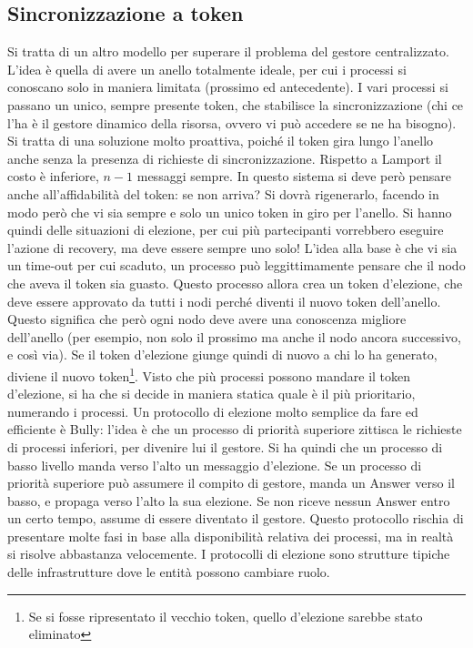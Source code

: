 \subsection{Sincronizzazione a token}
Si tratta di un altro modello per superare il problema del gestore centralizzato. L'idea è quella di avere un anello
totalmente ideale, per cui i processi si conoscano solo in maniera limitata (prossimo ed antecedente). I vari processi
si passano un unico, sempre presente token, che stabilisce la sincronizzazione (chi ce l'ha è il gestore dinamico della
risorsa, ovvero vi può accedere se ne ha bisogno). Si tratta di una soluzione molto proattiva, poiché il token gira
lungo l'anello anche senza la presenza di richieste di sincronizzazione. Rispetto a Lamport il costo è inferiore, 
$n-1$ messaggi sempre.
In questo sistema si deve però pensare anche all'affidabilità del token: se non arriva? Si dovrà rigenerarlo, facendo
in modo però che vi sia sempre e solo un unico token in giro per l'anello. Si hanno quindi delle situazioni di elezione,
per cui più partecipanti vorrebbero eseguire l'azione di recovery, ma deve essere sempre uno solo! L'idea alla base è
che vi sia un time-out per cui scaduto, un processo può leggittimamente pensare che il nodo che aveva il token sia
guasto.
Questo processo allora crea un token d'elezione, che deve essere approvato da tutti i nodi perché diventi il nuovo 
token dell'anello. Questo significa che però ogni nodo deve avere una conoscenza migliore dell'anello (per esempio, non
solo il prossimo ma anche il nodo ancora successivo, e così via). Se il token d'elezione giunge quindi di nuovo a chi
lo ha generato, diviene il nuovo token\footnote{Se si fosse ripresentato il vecchio token, quello d’elezione sarebbe
stato eliminato}. Visto che più processi possono mandare il token d'elezione, si ha che si decide in maniera
statica quale è il più prioritario, numerando i processi.
Un protocollo di elezione molto semplice da fare ed efficiente è Bully: l'idea è che un processo di priorità superiore
zittisca le richieste di processi inferiori, per divenire lui il gestore. Si ha quindi che un processo di basso livello
manda verso l'alto un messaggio d'elezione. Se un processo di priorità superiore può assumere il compito di gestore,
manda un Answer verso il basso, e propaga verso l'alto la sua elezione. Se non riceve nessun Answer entro un certo
tempo, assume di essere diventato il gestore. Questo protocollo rischia di presentare molte fasi in base alla
disponibilità relativa dei processi, ma in realtà si risolve abbastanza velocemente. I protocolli di elezione sono
strutture tipiche delle infrastrutture dove le entità possono cambiare ruolo.
